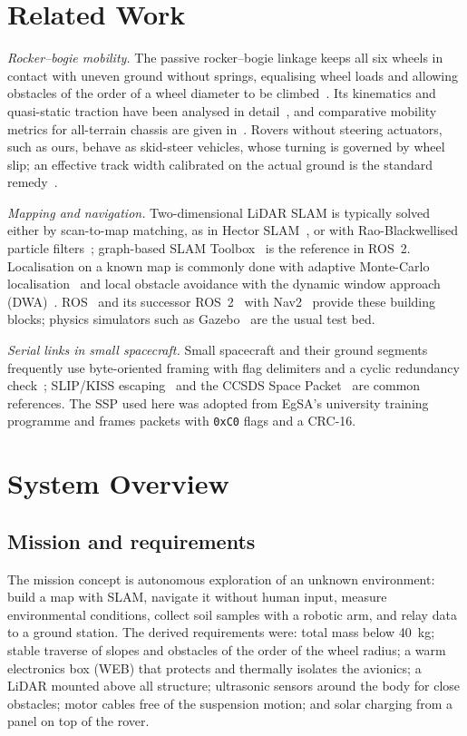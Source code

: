 \documentclass[conference]{IEEEtran}
\begin{document}
\section{Related Work}
\emph{Rocker--bogie mobility.} The passive rocker--bogie linkage keeps all six wheels in contact with uneven ground without springs, equalising wheel loads and allowing obstacles of the order of a wheel diameter to be climbed~\cite{bickler1989,lindemann2005}. Its kinematics and quasi-static traction have been analysed in detail~\cite{hacot1998,tarokh2005,iagnemma2004}, and comparative mobility metrics for all-terrain chassis are given in~\cite{thueer2010}. Rovers without steering actuators, such as ours, behave as skid-steer vehicles, whose turning is governed by wheel slip; an effective track width calibrated on the actual ground is the standard remedy~\cite{martinez2005,mandow2007}.

\emph{Mapping and navigation.} Two-dimensional LiDAR SLAM is typically solved either by scan-to-map matching, as in Hector SLAM~\cite{kohlbrecher2011}, or with Rao-Blackwellised particle filters~\cite{grisetti2007}; graph-based SLAM Toolbox~\cite{macenski2021} is the reference in ROS~2. Localisation on a known map is commonly done with adaptive Monte-Carlo localisation~\cite{fox2003,thrun2005} and local obstacle avoidance with the dynamic window approach (DWA)~\cite{fox1997}. ROS~\cite{quigley2009} and its successor ROS~2~\cite{macenski2022} with Nav2~\cite{macenski2020} provide these building blocks; physics simulators such as Gazebo~\cite{koenig2004} are the usual test bed.

\emph{Serial links in small spacecraft.} Small spacecraft and their ground segments frequently use byte-oriented framing with flag delimiters and a cyclic redundancy check~\cite{peterson1961,koopman2004}; SLIP/KISS escaping~\cite{rfc1055} and the CCSDS Space Packet~\cite{ccsds133} are common references. The SSP used here was adopted from EgSA's university training programme and frames packets with \texttt{0xC0} flags and a CRC-16.

\section{System Overview}
\label{sec:system}
\subsection{Mission and requirements}
The mission concept is autonomous exploration of an unknown environment: build a map with SLAM, navigate it without human input, measure environmental conditions, collect soil samples with a robotic arm, and relay data to a ground station. The derived requirements were: total mass below \SI{40}{\kilo\gram}; stable traverse of slopes and obstacles of the order of the wheel radius; a warm electronics box (WEB) that protects and thermally isolates the avionics; a LiDAR mounted above all structure; ultrasonic sensors around the body for close obstacles; motor cables free of the suspension motion; and solar charging from a panel on top of the rover.
\end{document}
